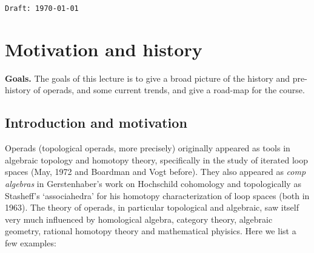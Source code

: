 \documentclass[fleqn, a4paper, twoside]{article}
\newcommand{\0}{\langle 0\rangle}
\DeclareRobustCommand{\[}{\begin{equation}}%
\DeclareRobustCommand{\]}{\end{equation}}%
\theoremstyle{mytheorem}
\theoremstyle{introthm}
\theoremstyle{mydefinition}
\theoremstyle{mydefinition2}
\theoremstyle{plain} %
\newcommand{\?}{\,?\,}
\theoremstyle{mytheorem}
\theoremstyle{plain} %
\newcommand\blankpage{%
    \null
    \thispagestyle{empty}%
    \newpage}
\begin{document}
\tableofcontents

\vfill

\hfill \texttt{Draft: \today} 

\afterpage{\blankpage}

\pagebreak

\thispagestyle{empty}


\section{Motivation and history}
 
\textbf{Goals.} The goals of this lecture is to
give a broad picture of the history and 
pre-history of operads, and some current trends,
and give a road-map for the course.  

\subsection{Introduction and motivation}
 
Operads (topological operads, more precisely)
originally appeared as tools in algebraic
topology and homotopy theory, 
specifically in the study of iterated loop 
spaces (May, 1972 and Boardman and Vogt before).
They also appeared as \emph{comp algebras} in Gerstenhaber's 
work on Hochschild cohomology and topologically as 
Stasheff's `associahedra' for his homotopy
characterization of loop spaces (both in 1963).
The theory of operads, in particular topological
and algebraic, saw itself very much influenced by
homological algebra, category theory, algebraic
geometry, rational homotopy theory and mathematical
phyisics. Here we list a few examples:
\end{document}
